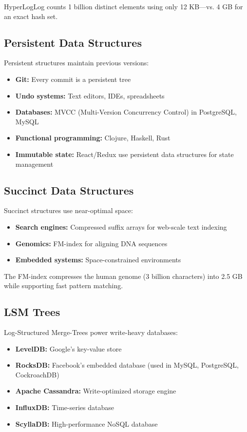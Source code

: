 HyperLogLog counts 1 billion distinct elements using only 12 KB---vs. 4 GB for an exact hash set.

\subsection{Persistent Data Structures}

Persistent structures maintain previous versions:
\begin{itemize}
    \item \textbf{Git:} Every commit is a persistent tree
    \item \textbf{Undo systems:} Text editors, IDEs, spreadsheets
    \item \textbf{Databases:} MVCC (Multi-Version Concurrency Control) in PostgreSQL, MySQL
    \item \textbf{Functional programming:} Clojure, Haskell, Rust
    \item \textbf{Immutable state:} React/Redux use persistent data structures for state management
\end{itemize}

\subsection{Succinct Data Structures}

Succinct structures use near-optimal space:
\begin{itemize}
    \item \textbf{Search engines:} Compressed suffix arrays for web-scale text indexing
    \item \textbf{Genomics:} FM-index for aligning DNA sequences
    \item \textbf{Embedded systems:} Space-constrained environments
\end{itemize}

The FM-index compresses the human genome (3 billion characters) into 2.5 GB while supporting fast pattern matching.

\subsection{LSM Trees}

Log-Structured Merge-Trees power write-heavy databases:
\begin{itemize}
    \item \textbf{LevelDB:} Google's key-value store
    \item \textbf{RocksDB:} Facebook's embedded database (used in MySQL, PostgreSQL, CockroachDB)
    \item \textbf{Apache Cassandra:} Write-optimized storage engine
    \item \textbf{InfluxDB:} Time-series database
    \item \textbf{ScyllaDB:} High-performance NoSQL database
\end{itemize}

